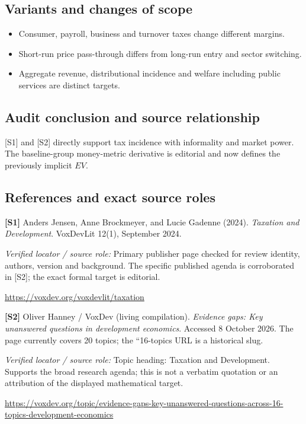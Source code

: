 \documentclass[11pt,a4paper]{article}
\begin{document}
\subsection*{Variants and changes of scope}

\begin{itemize}
\item Consumer, payroll, business and turnover taxes change different margins.
\item Short-run price pass-through differs from long-run entry and sector switching.
\item Aggregate revenue, distributional incidence and welfare including public services are distinct targets.
\end{itemize}

\subsection*{Audit conclusion and source relationship}

[S1] and [S2] directly support tax incidence with informality and market power. The baseline-group money-metric derivative is editorial and now defines the previously implicit \(EV\).

\subsection*{References and exact source roles}

{\footnotesize\raggedright
\par\noindent\textbf{[S1]} Anders Jensen, Anne Brockmeyer, and Lucie Gadenne (2024). \emph{Taxation and Development}. VoxDevLit 12(1), September 2024.\par \textit{Verified locator / source role:} Primary publisher page checked for review identity, authors, version and background. The specific published agenda is corroborated in [S2]; the exact formal target is editorial.\par \url{https://voxdev.org/voxdevlit/taxation}\par\smallskip
\par\noindent\textbf{[S2]} Oliver Hanney / VoxDev (living compilation). \emph{Evidence gaps: Key unanswered questions in development economics}. Accessed 8 October 2026. The page currently covers 20 topics; the ``16-topics URL is a historical slug.\par \textit{Verified locator / source role:} Topic heading: Taxation and Development. Supports the broad research agenda; this is not a verbatim quotation or an attribution of the displayed mathematical target.\par \url{https://voxdev.org/topic/evidence-gaps-key-unanswered-questions-across-16-topics-development-economics}\par\smallskip
}
\end{document}
